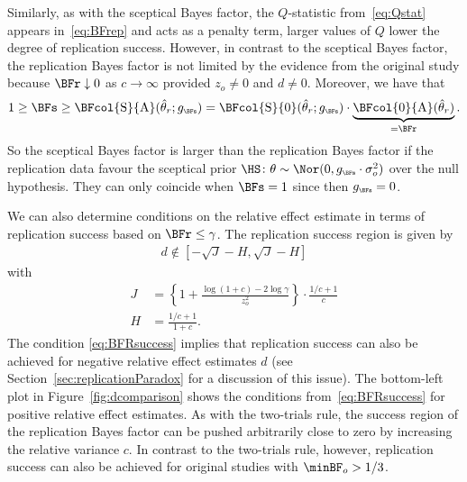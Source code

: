 Similarly, as with the sceptical Bayes factor, the $Q$-statistic
from~\eqref{eq:Qstat} appears in~\eqref{eq:BFrep} and acts as a penalty term,
\ie larger values of $Q$ lower the degree of replication success. However, in
contrast to the sceptical Bayes factor, the replication Bayes factor is not
limited by the evidence from the original study because $\BFr \downarrow 0$ as
$c \to \infty$ provided $z_{o} \neq 0$ and $d \neq 0$. Moreover, we have that
\begin{align*}
  1 \geq \BFs \geq \BFcol{\mathrm{S}}{\mathrm{A}}(\hat{\theta}_r; g_{\scriptscriptstyle \BFs})
  = \BFcol{\mathrm{S}}{0}(\hat{\theta}_r; g_{\scriptscriptstyle \BFs}) \cdot \underbrace{\BFcol{0}{\mathrm{A}}(\hat{\theta}_r)}_{= \BFr}.
\end{align*}
So the sceptical Bayes factor is larger than the replication Bayes factor if the
replication data favour the sceptical prior
$\HS \colon \theta \sim \Nor(0, g_{\scriptscriptstyle \BFs} \cdot \sigma^{2}_{o})$
over the null hypothesis. They can only coincide when $\BFs = 1$ since then
$g_{\scriptscriptstyle \BFs} = 0$.

We can also determine conditions on the relative effect estimate in terms of
replication success based on $\BFr \leq \gamma$. The replication success region
is given by
\begin{align}
  \label{eq:BFRsuccess}
  d \not\in [-\sqrt{J} - H, \sqrt{J} - H]
\end{align}
with
\begin{align*}
  J &= \left\{1 + \frac{\log(1 + c) - 2 \log \gamma}{z_o^2}\right\} \cdot
  \frac{1/c + 1}{c} \\
  H &= \frac{1/c + 1}{1 + c}.
\end{align*}
The condition \eqref{eq:BFRsuccess} implies that replication success can also be
achieved for negative relative effect estimates $d$ (see
Section~\ref{sec:replicationParadox} for a discussion of this issue). The
bottom-left plot in Figure~\ref{fig:dcomparison} shows the conditions
from~\eqref{eq:BFRsuccess} for positive relative effect estimates. As with the
two-trials rule, the success region of the replication Bayes factor can be
pushed arbitrarily close to zero by increasing the relative variance $c$. In
contrast to the two-trials rule, however, replication success can also be
achieved for original studies with $\minBF_{o} > 1/3$.

